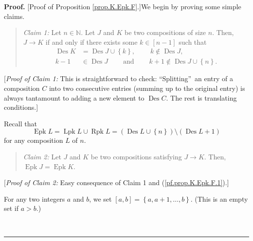 \documentclass[numbers=enddot,12pt,final,onecolumn,notitlepage]{scrartcl}%
\theoremstyle{definition}
\newenvironment{statement}{\begin{quote}}{\end{quote}}
\newenvironment{proof}[1][Proof]{\noindent\textbf{#1.} }{\ \rule{0.5em}{0.5em}}
\begin{document}
\begin{proof}
[Proof of Proposition \ref{prop.K.Epk.F}.]We begin by proving some simple claims.

\begin{statement}
\textit{Claim 1:} Let $n\in\mathbb{N}$. Let $J$ and $K$ be two compositions of
size $n$. Then, $J\rightarrow K$ if and only if there exists some $k\in\left[
n-1\right]  $ such that
\begin{align*}
\operatorname*{Des}K  &  =\operatorname*{Des}J\cup\left\{  k\right\}
,\ \ \ \ \ \ \ \ \ \ k\notin\operatorname*{Des}J,\\
k-1  &  \in\operatorname*{Des}J\ \ \ \ \ \ \ \ \ \ \text{and}%
\ \ \ \ \ \ \ \ \ \ k+1\notin\operatorname*{Des}J\cup\left\{  n\right\}  .
\end{align*}

\end{statement}

[\textit{Proof of Claim 1:} This is straightforward to check:
\textquotedblleft Splitting\textquotedblright\ an entry of a composition $C$
into two consecutive entries (summing up to the original entry) is always
tantamount to adding a new element to $\operatorname*{Des}C$. The rest is
translating conditions.]

Recall that
\begin{equation}
\operatorname*{Epk}L=\operatorname*{Lpk}L\cup\operatorname*{Rpk}L=\left(
\operatorname*{Des}L\cup\left\{  n\right\}  \right)  \setminus\left(
\operatorname*{Des}L+1\right)  \label{pf.prop.K.Epk.F.1}%
\end{equation}
for any composition $L$ of $n$.

\begin{statement}
\textit{Claim 2:} Let $J$ and $K$ be two compositions satisfying $J\rightarrow
K$. Then, $\operatorname*{Epk}J=\operatorname*{Epk}K$.
\end{statement}

[\textit{Proof of Claim 2:} Easy consequence of Claim 1 and
(\ref{pf.prop.K.Epk.F.1}).]

For any two integers $a$ and $b$, we set $\left[  a,b\right]  =\left\{
a,a+1,\ldots,b\right\}  $. (This is an empty set if $a>b$.)


\end{proof}
\end{document}
